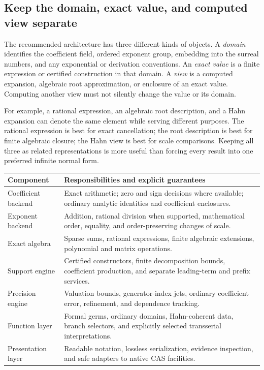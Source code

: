 \documentclass[11pt,letterpaper]{article}
\numberwithin{equation}{section}
\theoremstyle{definition}
\theoremstyle{remark}\newtheorem{remark}[theorem]{Remark}
\begin{document}
\subsection{Keep the domain, exact value, and computed view separate}
The recommended architecture has three different kinds of objects. A
\emph{domain} identifies the coefficient field, ordered exponent group,
embedding into the surreal numbers, and any exponential or derivation
conventions. An \emph{exact value} is a finite expression or certified
construction in that domain. A \emph{view} is a computed expansion, algebraic
root approximation, or enclosure of an exact value. Computing another view
must not silently change the value or its domain.

For example, a rational expression, an algebraic root description, and a
Hahn expansion can denote the same element while serving different purposes.
The rational expression is best for exact cancellation; the root description
is best for finite algebraic closure; the Hahn view is best for scale
comparisons. Keeping all three as related representations is more useful than
forcing every result into one preferred infinite normal form.

\begin{center}
\begin{tabularx}{\textwidth}{@{}P{0.25\textwidth}Y@{}}
\toprule
Component & Responsibilities and explicit guarantees\\
\midrule
Coefficient backend & Exact arithmetic; zero and sign decisions where
available; ordinary analytic identities and coefficient enclosures.\\[0.4em]
Exponent backend & Addition, rational division when supported, mathematical
order, equality, and order-preserving changes of scale.\\[0.4em]
Exact algebra & Sparse sums, rational expressions, finite algebraic
extensions, polynomial and matrix operations.\\[0.4em]
Support engine & Certified constructors, finite decomposition bounds,
coefficient production, and separate leading-term and prefix services.\\[0.4em]
Precision engine & Valuation bounds, generator-index jets, ordinary
coefficient error, refinement, and dependence tracking.\\[0.4em]
Function layer & Formal germs, ordinary domains, Hahn-coherent data,
branch selectors, and explicitly selected transserial interpretations.\\[0.4em]
Presentation layer & Readable notation, lossless serialization, evidence
inspection, and safe adapters to native CAS facilities.\\
\bottomrule
\end{tabularx}
\end{center}
\end{document}
